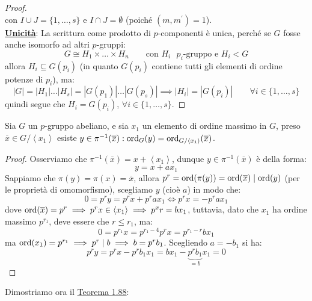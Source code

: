\documentclass[11pt]{scrartcl}
\begin{document}
\begin{proof}
\[                \]
        con $I \cup J = \{1,\ldots,s\}$ e $I \cap J = \emptyset$ (poiché $(m,m^{\prime}) = 1$). \\
        \underline{\textbf{Unicità}}: La scrittura come prodotto di $p$-componenti è unica, perché se $G$ fosse anche isomorfo ad altri $p$-gruppi:
            \[ G \cong H_1 \times \ldots \times H_n \qquad \text{con $H_i$ $p_i$-gruppo e $H_i<G$}
                \]
        allora $H_i \subseteq G(p_i)$ (in quanto $G(p_i)$ contiene tutti gli elementi di ordine potenze di $p_i$), ma:
            \[ |G| = |H_1| \ldots |H_s| = |G(p_1)| \ldots |G(p_s)| \implies |H_i| = |G(p_i)| \qquad \forall i \in \{1,\ldots,s\}
                \]
        quindi segue che $H_i = G(p_i)$, $\forall i \in \{1,\ldots,s\}$. 
\end{proof}

\begin{lemma}
    \label{l:1.91}
    Sia $G$ un $p$-gruppo abeliano, e sia $x_1$ un elemento di ordine massimo in $G$, preso $\overline x \in G/\left<x_1\right>$
     esiste $y \in \pi^{-1}(\overline x) : \operatorname{ord}_G(y) = \operatorname{ord}_{G/\left<x_1\right>}(\overline x)$.
\end{lemma}

\begin{proof}
    Osserviamo che $\pi^{-1}(\overline x) = x + \left<x_1\right>$, dunque $y \in \pi^{-1}(\overline x)$ è della forma:
        \[ y = x + ax_1
            \]
    Sappiamo che $\pi(y) = \pi(x) = \overline x$, allora $p^r = \operatorname{ord}(\pi(y)) = \operatorname{ord}(\overline x) \mid \operatorname{ord}(y)$ (per le proprietà di omomorfismo), scegliamo $y$ (cioè $a$) in modo che:
        \[ 0 = p^ry = p^rx + p^rax_1 \iff p^rx = -p^rax_1 
            \]
    dove $\operatorname{ord}(\overline x) = p^r \implies p^rx \in \left<x_1\right> \implies p^xr = bx_1$, tuttavia, dato che $x_1$ ha ordine massimo $p^{r_1}$, deve essere che $r \leq r_1$, ma:
        \[ 0 = p^{r_1}x = p^{r_1-4}p^rx = p^{r_1 - r}bx_1
            \]  
    ma $\operatorname{ord}(x_1) = p^{r_1} \implies p^r \mid b \implies b = p^rb_1$. Scegliendo $a = -b_1$ si ha:
        \[ p^ry = p^rx - p^rb_1x_1 = bx_1 - \underbrace{p^rb_1}_{= b}x_1 = 0
            \]
\end{proof}

\pagebreak

Dimostriamo ora il \hyperref[t:t2]{Teorema 1.88}:
\end{document}
